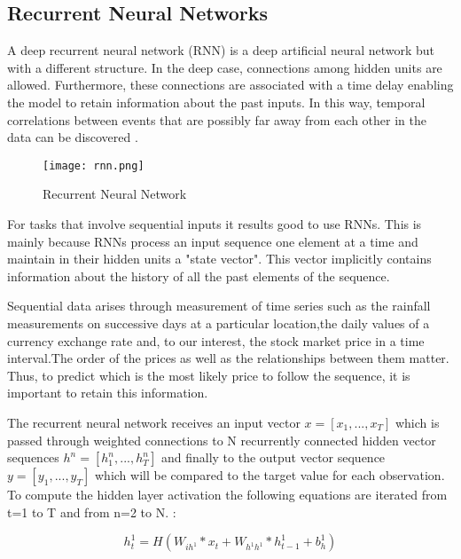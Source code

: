 \subsection{Recurrent Neural Networks}

A deep recurrent neural network (RNN) is a deep artificial neural network but with a different structure. In the deep case, connections among hidden units are allowed. Furthermore, these connections are associated with a time delay enabling the model to retain information about the past inputs. In this way, temporal correlations between events that are possibly far away from each other in the data can be discovered \cite{pascanu2013difficulty}.

\begin{figure}
\label{fig:rnn}
\center
\texttt{[image: rnn.png]}
\caption{Recurrent Neural Network}
\end{figure}
For tasks that involve sequential inputs it results good to use RNNs. This is mainly because RNNs process an input sequence one element at a time and maintain in their hidden units a "state vector". This vector implicitly contains information about the history of all the past elements of the sequence.\cite{lecun2015deep} 

Sequential data arises through measurement of time series such as the rainfall measurements on successive days at a particular location,the daily values of a currency exchange rate and, to our interest, the stock market price in a time interval.The order of the prices as well as the relationships between them matter. Thus, to predict which is the most likely price to follow the sequence, it is important to retain this information.

The recurrent neural network receives an input vector $x=[x_1,...,x_T]$ which is passed through weighted connections to N recurrently connected hidden vector sequences $h^n=[h_1^n,...,h_T^n]$ and finally to the output vector sequence $y=[y_1,...,y_T]$ which will be compared to the target value for each observation. To compute the hidden layer activation the following equations are iterated from t=1 to T and from n=2 to N. \cite{graves2013generating}:

\begin{equation} \label{eq:hidden1}
h_t^1= H( W_{ih^1} * x_t + W_{h^1 h^1}*h^1_{t-1} + b^1_h)
\end{equation}

